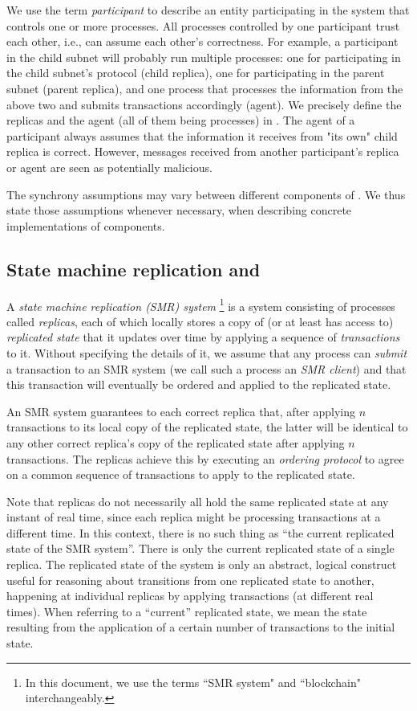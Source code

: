 We use the term \emph{participant} to describe an entity participating in the system that controls one or more processes.
All processes controlled by one participant trust each other, i.e., can assume each other's correctness.
For example, a participant in the child subnet will probably run multiple processes:
one for participating in the child subnet's protocol (child replica),
one for participating in the parent subnet (parent replica),
and one process that processes the information from the above two and submits transactions accordingly (\ipc agent).
We precisely define the replicas and the \ipc agent (all of them being processes) in .
The \ipc agent of a participant always assumes that the information it receives from "its own" child replica is correct.
However, messages received from another participant's replica or \ipc agent are seen as potentially malicious.

The synchrony assumptions may vary between different components of \ipc.
We thus state those assumptions whenever necessary, when describing concrete implementations of \ipc components.

\subsection{State machine replication and \dapps}
\label{sec:smr}

A \emph{state machine replication (SMR) system}%
\footnote{In this document, we use the terms ``SMR system" and ``blockchain" interchangeably.}
is a system consisting of processes called \emph{replicas}, each of which locally stores a copy of (or at least has access to) \emph{replicated state}
that it updates over time by applying a sequence of \emph{transactions} to it.
Without specifying the details of it, we assume that any process can \emph{submit} a transaction to an SMR system (we call such a process an \emph{SMR client})
and that this transaction will eventually be ordered and applied to the replicated state.

An SMR system guarantees to each correct replica that, after applying $n$ transactions to its local copy of the replicated state,
the latter will be identical to any other correct replica’s copy of the replicated state after applying $n$ transactions.
The replicas achieve this by executing an \emph{ordering protocol} to agree on a common sequence of transactions to apply to the replicated state.

Note that replicas do not necessarily all hold the same replicated state at any instant of real time,
since each replica might be processing transactions at a different time.
In this context, there is no such thing as “the current replicated state of the SMR system”.
There is only the current replicated state of a single replica.
The replicated state of the system is only an abstract, logical construct
useful for reasoning about transitions from one replicated state to another,
happening at individual replicas by applying transactions (at different real times).
When referring to a “current” replicated state, we mean the state resulting from the application of a certain number of transactions to the initial state.


